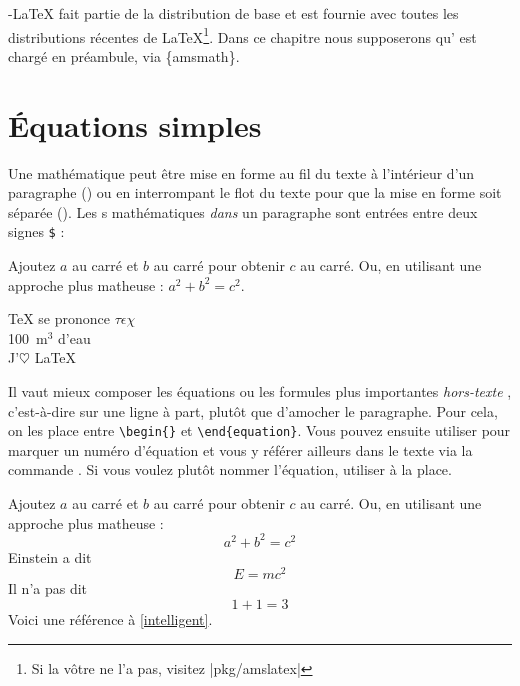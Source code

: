 \AmS-\LaTeX{} fait partie de la distribution de base et est fournie
avec toutes les distributions récentes de \LaTeX{}\footnote{Si la
  vôtre ne l'a pas, visitez
  \CTAN|pkg/amslatex|}. Dans ce chapitre nous
  supposerons qu' est chargé en préambule, via
  {\{amsmath\}}.

\section{Équations simples}

Une  mathématique peut être mise en forme
au fil du texte à l'intérieur d'un paragraphe
(\emph{}) ou en interrompant le flot du texte pour
que la mise en forme soit séparée (\textit{}). Les
s mathématiques \emph{dans} un paragraphe sont entrées
entre deux signes \index{$\iffalse$\fi @\texttt{\$}} \texttt{\$} :
\begin{example}
Ajoutez $a$ au carré 
et $b$ au carré pour obtenir
$c$ au carré. Ou, en 
utilisant une approche plus
matheuse : $a^2 + b^2 = c^2$.
\end{example}
\begin{example}
 \TeX{} se prononce 
$\tau\epsilon\chi$\\[5pt]
100~m$^{3}$ d'eau\\[5pt]
J'$\heartsuit$ \LaTeX{}
\end{example}

Il vaut mieux composer les équations ou les formules plus importantes
\og \emph{hors-texte} \fg{}, c'est-à-dire sur une ligne à part, plutôt que
d'amocher le paragraphe.  Pour cela, on les
place entre \verb|\begin{|\verb|}| et
\verb|\end{equation}|.
Vous pouvez ensuite utiliser  pour marquer un numéro
d'équation et vous y référer ailleurs dans le texte via la commande
. Si vous voulez plutôt nommer l'équation, utiliser 
à la place.

\begin{example}
Ajoutez $a$ au carré 
et $b$ au carré pour obtenir
$c$ au carré. Ou, en 
utilisant une approche plus
matheuse :
 \begin{equation}
   a^2 + b^2 = c^2
 \end{equation}
Einstein a dit
 \begin{equation}
   E = mc^2 \label{intelligent}
 \end{equation}
Il n'a pas dit
 \begin{equation}
  1 + 1 = 3 \tag{idiot}
 \end{equation}
Voici une référence à
\eqref{intelligent}.
\end{example}

